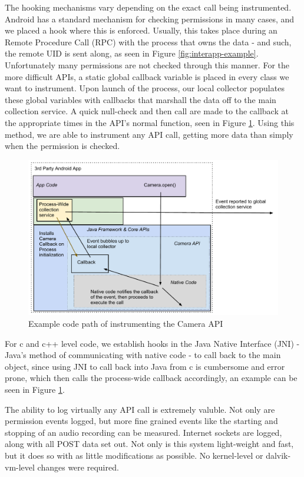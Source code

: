 The hooking mechanisms vary depending on the exact call being instrumented. Android has a standard mechanism for checking permissions in many cases, and we placed a hook where this is enforced. Usually, this takes place during an Remote Procedure Call (RPC) with the process that owns the data - and such, the remote UID is sent along, as seen in Figure \ref{fig:interapp-example}. Unfortunately many permissions are not checked through this manner. For the more difficult APIs, a static global callback variable is placed in every class we want to instrument. Upon launch of the process, our local collector populates these global variables with callbacks that marshall the data off to the main collection service. A quick null-check and then call are made to the callback at the appropriate times in the API's normal function, seen in Figure \ref{fig:camera-example}. Using this method, we are able to instrument any API call, getting more data than simply when the permission is checked.

\begin{figure}[t]
\begin{center}
\includegraphics[width=0.6\columnwidth]{figs/AndroMEDA-Static-Example}
\caption{Example code path of instrumenting the Camera API}
\label{fig:camera-example}
\end{center}
\end{figure}

For c and c++ level code, we establish hooks in the Java Native Interface (JNI) - Java's method of communicating with native code - to call back to the main object, since using JNI to call back into Java from c is cumbersome and error prone, which then calls the process-wide callback accordingly, an example can be seen in Figure \ref{fig:camera-example}.

The ability to log virtually any API call is extremely valuble. Not only are permission events logged, but more fine grained events like the starting and stopping of an audio recording can be measured. Internet sockets are logged, along with all POST data set out. Not only is this system light-weight and fast, but it does so with as little modifications as possible. No kernel-level or dalvik-vm-level changes were required.

